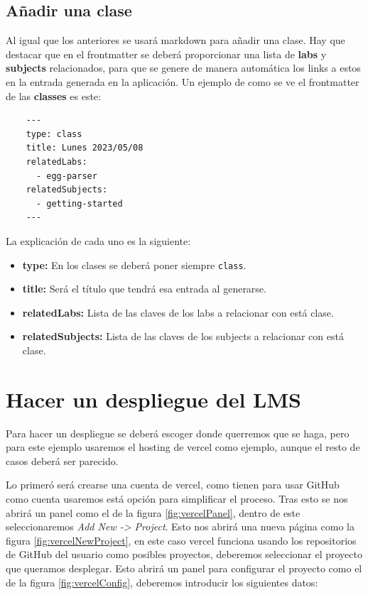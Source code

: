 \subsection{Añadir una clase}

Al igual que los anteriores se usará markdown para añadir una clase. Hay que destacar que en el frontmatter se deberá proporcionar una lista de \textbf{labs} y \textbf{subjects} relacionados, para que se genere de manera automática los links a estos en la entrada generada en la aplicación.
Un ejemplo de como se ve el frontmatter de las \textbf{classes} es este:

\begin{verbatim}
    ---
    type: class
    title: Lunes 2023/05/08
    relatedLabs:
      - egg-parser
    relatedSubjects:
      - getting-started
    ---
\end{verbatim}

La explicación de cada uno es la siguiente:

\begin{itemize}
    \item \textbf{type:} En los clases se deberá poner siempre \verb|class|.
    \item \textbf{title:} Será el título que tendrá esa entrada al generarse.
    \item \textbf{relatedLabs:} Lista de las claves de los labs a relacionar con está clase.
    \item \textbf{relatedSubjects:} Lista de las claves de los subjects a relacionar con está clase.
\end{itemize}

\section{Hacer un despliegue del LMS}

Para hacer un despliegue se deberá escoger donde querremos que se haga, pero para este ejemplo usaremos el hosting de vercel como ejemplo, aunque el resto de casos deberá ser parecido.

Lo primeró será crearse una cuenta de vercel, como tienen para usar GitHub como cuenta usaremos está opción para simplificar el proceso. Tras esto se nos abrirá un panel como el de la figura \ref{fig:vercelPanel}, dentro de este seleccionaremos \textit{Add New -> Project}. Esto nos abrirá una nueva página como la figura \ref{fig:vercelNewProject}, en este caso vercel funciona usando los repositorios de GitHub del usuario como posibles proyectos, deberemos seleccionar el proyecto que queramos desplegar. Esto abrirá un panel para configurar el proyecto como el de la figura \ref{fig:vercelConfig}, deberemos introducir los siguientes datos:

